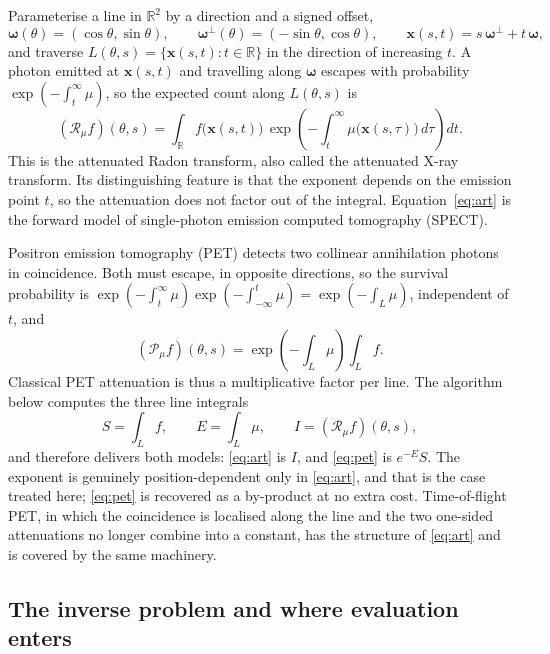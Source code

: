 \documentclass[11pt]{article}
\newcommand{\bx}{\mathbf{x}}
\newcommand{\om}{\boldsymbol{\omega}}
\newcommand{\omp}{\om^{\perp}}
\newcommand{\Rmu}{\mathcal{R}_{\mu}}
\begin{document}
Parameterise a line in $\mathbb{R}^2$ by a direction and a signed offset,
\begin{equation}
  \om(\theta)=(\cos\theta,\sin\theta),\qquad
  \omp(\theta)=(-\sin\theta,\cos\theta),\qquad
  \bx(s,t)=s\,\omp+t\,\om ,
\end{equation}
and traverse $L(\theta,s)=\{\bx(s,t):t\in\mathbb{R}\}$ in the direction of
increasing $t$. A photon emitted at $\bx(s,t)$ and travelling along $\om$
escapes with probability $\exp(-\int_t^{\infty}\mu)$, so the expected count
along $L(\theta,s)$ is
\begin{equation}
  (\Rmu f)(\theta,s)
  = \int_{\mathbb{R}} f\big(\bx(s,t)\big)\,
    \exp\!\left(-\int_t^{\infty}\mu\big(\bx(s,\tau)\big)\,d\tau\right) dt .
  \label{eq:art}
\end{equation}
This is the attenuated Radon transform, also called the attenuated X-ray
transform. Its distinguishing feature is that the exponent depends on the
emission point $t$, so the attenuation does not factor out of the integral.
Equation~\eqref{eq:art} is the forward model of single-photon emission
computed tomography (SPECT).

Positron emission tomography (PET) detects two collinear annihilation photons
in coincidence. Both must escape, in opposite directions, so the survival
probability is $\exp(-\int_t^{\infty}\mu)\exp(-\int_{-\infty}^{t}\mu)
=\exp(-\int_L\mu)$, independent of $t$, and
\begin{equation}
  (\mathcal{P}_{\mu}f)(\theta,s)
  = \exp\!\left(-\int_L \mu\right)\int_L f .
  \label{eq:pet}
\end{equation}
Classical PET attenuation is thus a multiplicative factor per line. The
algorithm below computes the three line integrals
\begin{equation}
  S=\int_L f,\qquad E=\int_L\mu,\qquad I=(\Rmu f)(\theta,s),
  \label{eq:three}
\end{equation}
and therefore delivers both models: \eqref{eq:art} is $I$, and \eqref{eq:pet}
is $e^{-E}S$. The exponent is genuinely position-dependent only in
\eqref{eq:art}, and that is the case treated here; \eqref{eq:pet} is recovered
as a by-product at no extra cost. Time-of-flight PET, in which the coincidence
is localised along the line and the two one-sided attenuations no longer
combine into a constant, has the structure of \eqref{eq:art} and is covered by
the same machinery.

\subsection{The inverse problem and where evaluation enters}
\label{sec:motivation}
\end{document}
